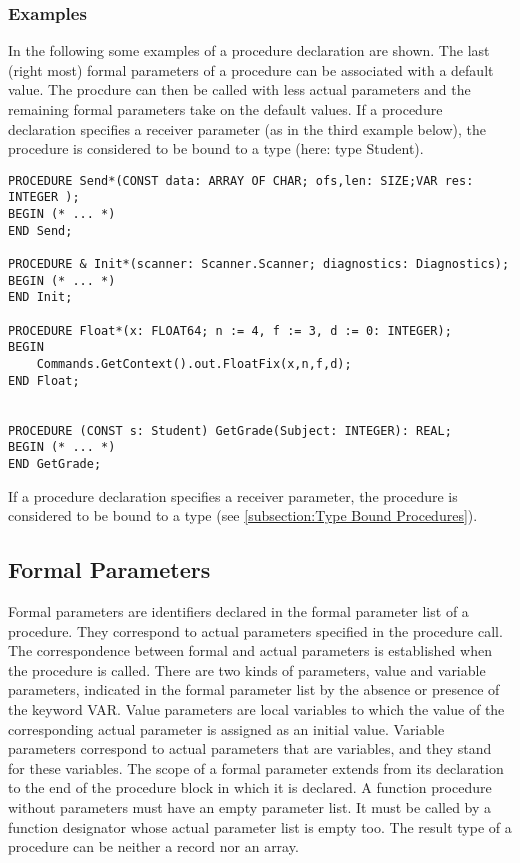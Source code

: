 \documentclass[a4wide,11pt]{article}
\begin{document}
\begin{annotation}
\subsubsection{Examples}
In the following some examples of a procedure declaration are shown.
The last (right most) formal parameters of a procedure can be associated with a default value.
The procdure can then be called with less actual parameters and the remaining formal parameters take on the default values.
If a procedure declaration specifies a receiver parameter (as in the third example below), the procedure is considered to be bound to a type (here: type Student).

\begin{lstlisting}[style=example]
PROCEDURE Send*(CONST data: ARRAY OF CHAR; ofs,len: SIZE;VAR res: INTEGER );
BEGIN (* ... *)
END Send;

PROCEDURE & Init*(scanner: Scanner.Scanner; diagnostics: Diagnostics);
BEGIN (* ... *)
END Init;

PROCEDURE Float*(x: FLOAT64; n := 4, f := 3, d := 0: INTEGER);
BEGIN
	Commands.GetContext().out.FloatFix(x,n,f,d);
END Float;


PROCEDURE (CONST s: Student) GetGrade(Subject: INTEGER): REAL;
BEGIN (* ... *)
END GetGrade;
\end{lstlisting}
\end{annotation}

If a procedure declaration specifies a receiver parameter, the procedure is considered to be bound to a type (see \ref{subsection:Type Bound Procedures}).

\subsection{Formal Parameters}\label{subsection: Formal Parameters}
Formal parameters are identifiers declared in the formal parameter list of a procedure.
They correspond to actual parameters specified in the procedure call.
The correspondence between formal and actual parameters is established when the procedure is called.
There are two kinds of parameters, value and variable parameters, indicated in the formal parameter list by the absence or presence of the keyword VAR.
Value parameters are local variables to which the value of the corresponding actual parameter is assigned as an initial value.
Variable parameters correspond to actual parameters that are variables, and they stand for these variables.
The scope of a formal parameter extends from its declaration to the end of the procedure block in which it is declared.
A function procedure without parameters must have an empty parameter list.
It must be called by a function designator whose actual parameter list is empty too.
The result type of a procedure can be neither a record nor an array.
\end{document}
